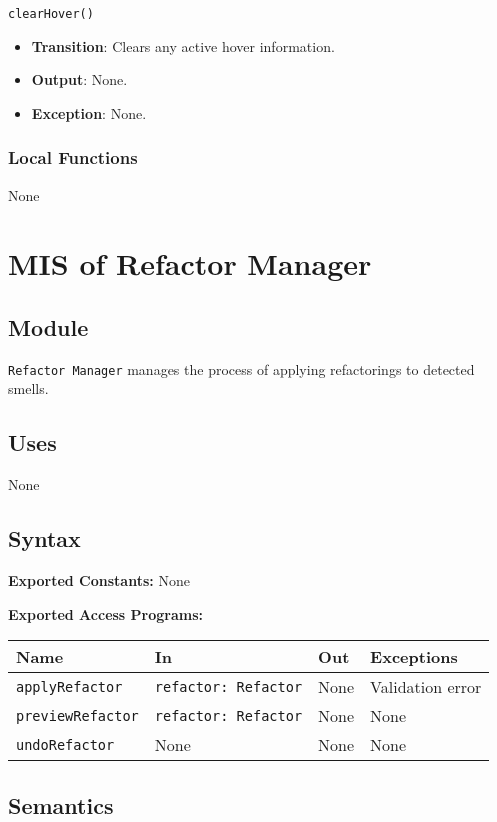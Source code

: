 \documentclass[12pt, titlepage]{article}
\begin{document}
\texttt{clearHover()}
\begin{itemize}
\item \textbf{Transition}: Clears any active hover information.
\item \textbf{Output}: None.
\item \textbf{Exception}: None.
\end{itemize}

\subsubsection{Local Functions}
None

\section{MIS of Refactor Manager}

\subsection{Module}
\texttt{Refactor Manager} manages the process of applying refactorings to detected smells.

\subsection{Uses}
None

\subsection{Syntax}

\textbf{Exported Constants:} None

\textbf{Exported Access Programs:}\\
\begin{tabularx}{\linewidth}{|l|>{\raggedright\arraybackslash}X|l|l|}
  \toprule Name & In & Out & Exceptions \\
  \midrule
  \texttt{applyRefactor} & \texttt{refactor: Refactor} & None & Validation error \\ \hline
  \texttt{previewRefactor} & \texttt{refactor: Refactor} & None & None \\ \hline
  \texttt{undoRefactor} & None & None & None \\
  \bottomrule
\end{tabularx}

\subsection{Semantics}
\end{document}
